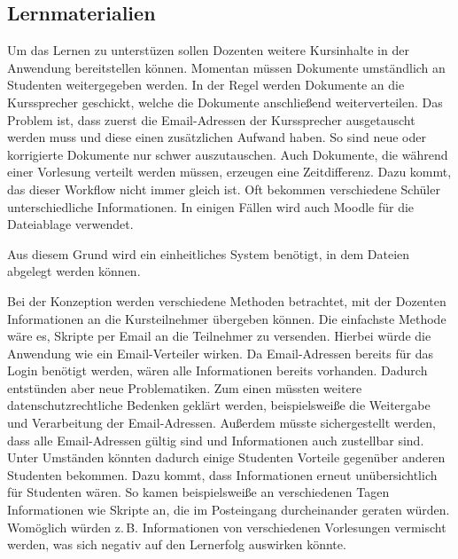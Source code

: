 \subsection{Lernmaterialien}
Um das Lernen zu unterstüzen sollen Dozenten weitere Kursinhalte in der Anwendung bereitstellen können.
Momentan müssen Dokumente umständlich an Studenten weitergegeben werden.
In der Regel werden Dokumente an die Kurssprecher geschickt, welche die Dokumente anschließend weiterverteilen.
Das Problem ist, dass zuerst die Email-Adressen der Kurssprecher ausgetauscht werden muss und diese einen zusätzlichen Aufwand haben.
So sind neue oder korrigierte Dokumente nur schwer auszutauschen.
Auch Dokumente, die während einer Vorlesung verteilt werden müssen, erzeugen eine Zeitdifferenz.
Dazu kommt, das dieser Workflow nicht immer gleich ist.
Oft bekommen verschiedene Schüler unterschiedliche Informationen.
In einigen Fällen wird auch Moodle für die Dateiablage verwendet.

Aus diesem Grund wird ein einheitliches System benötigt, in dem Dateien abgelegt werden können.

Bei der Konzeption werden verschiedene Methoden betrachtet, mit der Dozenten Informationen an die Kursteilnehmer übergeben können.
Die einfachste Methode wäre es, Skripte per Email an die Teilnehmer zu versenden.
Hierbei würde die Anwendung wie ein Email-Verteiler wirken. Da Email-Adressen bereits für das Login benötigt werden, wären alle Informationen bereits vorhanden.
Dadurch entstünden aber neue Problematiken. Zum einen müssten weitere datenschutzrechtliche Bedenken geklärt werden, beispielsweiße die Weitergabe und Verarbeitung der Email-Adressen. Außerdem müsste sichergestellt werden, dass alle Email-Adressen gültig sind und Informationen auch zustellbar sind. Unter Umständen könnten dadurch einige Studenten Vorteile gegenüber anderen Studenten bekommen.
Dazu kommt, dass Informationen erneut unübersichtlich für Studenten wären. So kamen beispielsweiße an verschiedenen Tagen Informationen wie Skripte an, die im Posteingang durcheinander geraten würden. Womöglich würden z.\,B. Informationen von verschiedenen Vorlesungen vermischt werden, was sich negativ auf den Lernerfolg auswirken könnte.

